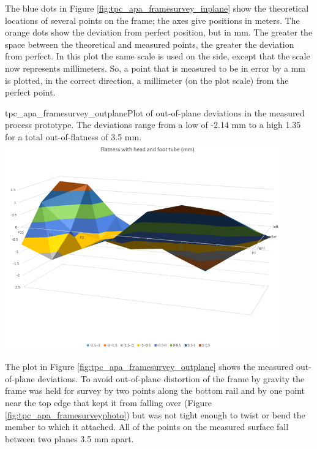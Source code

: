 
The blue dots in Figure \ref{fig:tpc_apa_framesurvey_inplane} show the theoretical locations of several points on the frame; the axes give positions in meters.  The orange dots show the deviation from perfect position, but in mm.  %
The greater the space between the theoretical and measured points, the greater the deviation from perfect.  In this plot the same scale is used on the side, except that the scale now represents millimeters.  So, a point that is measured to be in error by a mm is plotted, in the correct direction, a millimeter (on the plot scale) from the perfect point.

\begin{cdrfigure}{tpc_apa_framesurvey_outplane}{Plot of out-of-plane deviations in the measured process prototype.  The deviations range from a low of -2.14 mm to a high 1.35 for a total out-of-flatness of 3.5 mm.}
\includegraphics[width=0.9\textwidth]{figures/tpc_apa_framesurvey_outplane.png} 
\end{cdrfigure}

The plot in Figure \ref{fig:tpc_apa_framesurvey_outplane} shows the measured out-of-plane deviations.  To avoid out-of-plane distortion of the frame by gravity the frame was held for survey by two points along the bottom rail and by one point near the top edge that kept it from falling over (Figure \ref{fig:tpc_apa_framesurveyphoto}) but was not tight enough to twist or bend the member to which it attached.  All of the points on the measured surface fall between two planes 3.5 mm apart.

